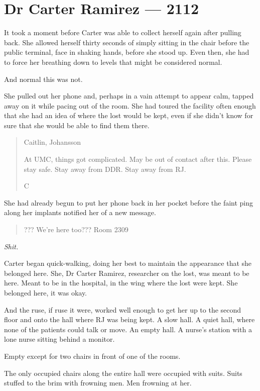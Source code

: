 \hypertarget{dr-carter-ramirez-2112}{%
\chapter*{Dr Carter Ramirez — 2112}\label{dr-carter-ramirez-2112}}

It took a moment before Carter was able to collect herself again after pulling back. She allowed herself thirty seconds of simply sitting in the chair before the public terminal, face in shaking hands, before she stood up. Even then, she had to force her breathing down to levels that might be considered normal.

And normal this was not.

She pulled out her phone and, perhaps in a vain attempt to appear calm, tapped away on it while pacing out of the room. She had toured the facility often enough that she had an idea of where the lost would be kept, even if she didn't know for sure that she would be able to find them there.

\begin{quote}
Caitlin, Johansson

At UMC, things got complicated. May be out of contact after this. Please stay safe. Stay away from DDR. Stay away from RJ.

C
\end{quote}

She had already begun to put her phone back in her pocket before the faint ping along her implants notified her of a new message.

\begin{quote}
??? We're here too??? Room 2309
\end{quote}

\emph{Shit.}

Carter began quick-walking, doing her best to maintain the appearance that she belonged here. She, Dr Carter Ramirez, researcher on the lost, was meant to be here. Meant to be in the hospital, in the wing where the lost were kept. She belonged here, it was okay.

And the ruse, if ruse it were, worked well enough to get her up to the second floor and onto the hall where RJ was being kept. A slow hall. A quiet hall, where none of the patients could talk or move. An empty hall. A nurse's station with a lone nurse sitting behind a monitor.

Empty except for two chairs in front of one of the rooms.

The only occupied chairs along the entire hall were occupied with suits. Suits stuffed to the brim with frowning men. Men frowning at her.

